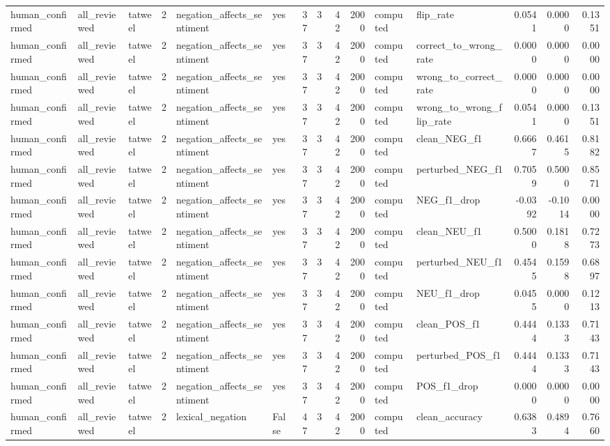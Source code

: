 \begin{tabular}{lllrllrrrrllrrr}
human_confirmed & all_reviewed & tatweel & 2 & negation_affects_sentiment & yes & 37 & 3 & 42 & 2000 & computed & flip_rate & 0.0541 & 0.0000 & 0.1351 \\
human_confirmed & all_reviewed & tatweel & 2 & negation_affects_sentiment & yes & 37 & 3 & 42 & 2000 & computed & correct_to_wrong_rate & 0.0000 & 0.0000 & 0.0000 \\
human_confirmed & all_reviewed & tatweel & 2 & negation_affects_sentiment & yes & 37 & 3 & 42 & 2000 & computed & wrong_to_correct_rate & 0.0000 & 0.0000 & 0.0000 \\
human_confirmed & all_reviewed & tatweel & 2 & negation_affects_sentiment & yes & 37 & 3 & 42 & 2000 & computed & wrong_to_wrong_flip_rate & 0.0541 & 0.0000 & 0.1351 \\
human_confirmed & all_reviewed & tatweel & 2 & negation_affects_sentiment & yes & 37 & 3 & 42 & 2000 & computed & clean_NEG_f1 & 0.6667 & 0.4615 & 0.8182 \\
human_confirmed & all_reviewed & tatweel & 2 & negation_affects_sentiment & yes & 37 & 3 & 42 & 2000 & computed & perturbed_NEG_f1 & 0.7059 & 0.5000 & 0.8571 \\
human_confirmed & all_reviewed & tatweel & 2 & negation_affects_sentiment & yes & 37 & 3 & 42 & 2000 & computed & NEG_f1_drop & -0.0392 & -0.1014 & 0.0000 \\
human_confirmed & all_reviewed & tatweel & 2 & negation_affects_sentiment & yes & 37 & 3 & 42 & 2000 & computed & clean_NEU_f1 & 0.5000 & 0.1818 & 0.7273 \\
human_confirmed & all_reviewed & tatweel & 2 & negation_affects_sentiment & yes & 37 & 3 & 42 & 2000 & computed & perturbed_NEU_f1 & 0.4545 & 0.1598 & 0.6897 \\
human_confirmed & all_reviewed & tatweel & 2 & negation_affects_sentiment & yes & 37 & 3 & 42 & 2000 & computed & NEU_f1_drop & 0.0455 & 0.0000 & 0.1213 \\
human_confirmed & all_reviewed & tatweel & 2 & negation_affects_sentiment & yes & 37 & 3 & 42 & 2000 & computed & clean_POS_f1 & 0.4444 & 0.1333 & 0.7143 \\
human_confirmed & all_reviewed & tatweel & 2 & negation_affects_sentiment & yes & 37 & 3 & 42 & 2000 & computed & perturbed_POS_f1 & 0.4444 & 0.1333 & 0.7143 \\
human_confirmed & all_reviewed & tatweel & 2 & negation_affects_sentiment & yes & 37 & 3 & 42 & 2000 & computed & POS_f1_drop & 0.0000 & 0.0000 & 0.0000 \\
human_confirmed & all_reviewed & tatweel & 2 & lexical_negation & False & 47 & 3 & 42 & 2000 & computed & clean_accuracy & 0.6383 & 0.4894 & 0.7660 \\

\end{tabular}
